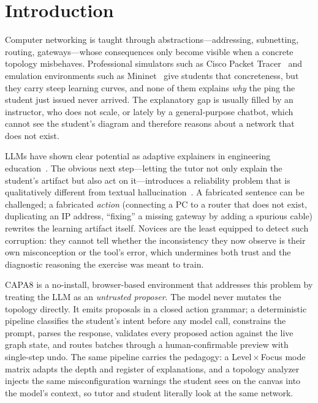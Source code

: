 \documentclass[conference,a4paper]{IEEEtran}
\begin{document}
\section{Introduction}
Computer networking is taught through abstractions---addressing, subnetting, routing, gateways---whose consequences only become visible when a concrete topology misbehaves. Professional simulators such as Cisco Packet Tracer~\cite{packettracer} and emulation environments such as Mininet~\cite{lantz2010mininet} give students that concreteness, but they carry steep learning curves, and none of them explains \emph{why} the ping the student just issued never arrived. The explanatory gap is usually filled by an instructor, who does not scale, or lately by a general-purpose chatbot, which cannot see the student's diagram and therefore reasons about a network that does not exist.

LLMs have shown clear potential as adaptive explainers in engineering education~\cite{kasneci2023chatgpt,denny2024computing}. The obvious next step---letting the tutor not only explain the student's artifact but also act on it---introduces a reliability problem that is qualitatively different from textual hallucination~\cite{ji2023survey}. A fabricated sentence can be challenged; a fabricated \emph{action} (connecting a PC to a router that does not exist, duplicating an IP address, ``fixing'' a missing gateway by adding a spurious cable) rewrites the learning artifact itself. Novices are the least equipped to detect such corruption: they cannot tell whether the inconsistency they now observe is their own misconception or the tool's error, which undermines both trust and the diagnostic reasoning the exercise was meant to train.

CAPA8 is a no-install, browser-based environment that addresses this problem by treating the LLM as an \emph{untrusted proposer}. The model never mutates the topology directly. It emits proposals in a closed action grammar; a deterministic pipeline classifies the student's intent before any model call, constrains the prompt, parses the response, validates every proposed action against the live graph state, and routes batches through a human-confirmable preview with single-step undo. The same pipeline carries the pedagogy: a Level\,$\times$\,Focus mode matrix adapts the depth and register of explanations, and a topology analyzer injects the same misconfiguration warnings the student sees on the canvas into the model's context, so tutor and student literally look at the same network.
\end{document}
